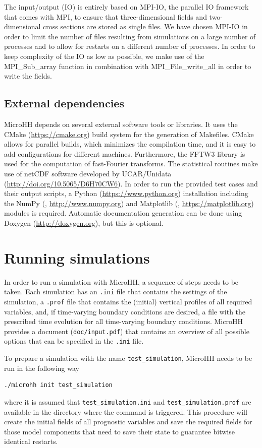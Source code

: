 \documentclass[gmd,manuscript]{copernicus}
\begin{document}
The input/output (IO) is entirely based on MPI-IO, the parallel IO framework that comes with MPI, to ensure that three-dimensional fields and two-dimensional cross sections are stored as single files. We have chosen MPI-IO in order to limit the number of files resulting from simulations on a large number of processes and to allow for restarts on a different number of processes. In order to keep complexity of the IO as low as possible, we make use of the MPI\_Sub\_array function in combination with MPI\_File\_write\_all in order to write the fields.

\subsection{External dependencies}
MicroHH depends on several external software tools or libraries. It uses the CMake (\url{https://cmake.org}) build system for the generation of Makefiles. CMake allows for parallel builds, which minimizes the compilation time, and it is easy to add configurations for different machines. Furthermore, the FFTW3 library \citep{Frigo2005} is used for the computation of fast-Fourier transforms. The statistical routines make use of netCDF software developed by UCAR/Unidata (\url{http://doi.org/10.5065/D6H70CW6}). In order to run the provided test cases and their output scripts, a Python (\url{https://www.python.org}) installation including the NumPy (\citet{vanderWalt2011}, \url{http://www.numpy.org}) and Matplotlib (\citet{Hunter2007}, \url{https://matplotlib.org}) modules is required. Automatic documentation generation can be done using Doxygen (\url{http://doxygen.org}), but this is optional.

\section{Running simulations}\label{sec:running}
\label{sec:running_simulations}
In order to run a simulation with MicroHH, a sequence of steps needs to be taken. Each simulation has an \texttt{.ini} file that contains the settings of the simulation, a \texttt{.prof} file that contains the (initial) vertical profiles of all required variables, and, if time-varying boundary conditions are desired, a file with the prescribed time evolution for all time-varying boundary conditions. MicroHH provides a document (\texttt{doc/input.pdf}) that contains an overview of all possible options that can be specified in the \texttt{.ini} file.

To prepare a simulation with the name \texttt{test\_simulation}, MicroHH needs to be run in the following way
\begin{verbatim}
./microhh init test_simulation
\end{verbatim}
where it is assumed that \texttt{test\_simulation.ini} and \texttt{test\_simulation.prof} are available in the directory where the command is triggered. This procedure will create the initial fields of all prognostic variables and save the required fields for those model components that need to save their state to guarantee bitwise identical restarts. 
\end{document}
